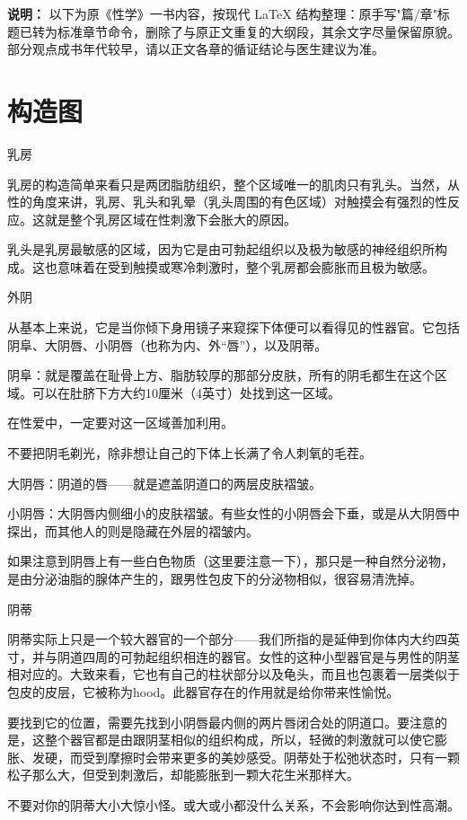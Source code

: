 \documentclass[12pt,UTF8,openany]{ctexbook}
\begin{document}
\noindent\textbf{说明：} 以下为原《性学》一书内容，按现代 LaTeX 结构整理：原手写"篇/章"标题已转为标准章节命令，删除了与原正文重复的大纲段，其余文字尽量保留原貌。部分观点成书年代较早，请以正文各章的循证结论与医生建议为准。

\chapter{构造图}

乳房

乳房的构造简单来看只是两团脂肪组织，整个区域唯一的肌肉只有乳头。当然，从性的角度来讲，乳房、乳头和乳晕（乳头周围的有色区域）对触摸会有强烈的性反应。这就是整个乳房区域在性刺激下会胀大的原因。

乳头是乳房最敏感的区域，因为它是由可勃起组织以及极为敏感的神经组织所构成。这也意味着在受到触摸或寒冷刺激时，整个乳房都会膨胀而且极为敏感。

外阴

从基本上来说，它是当你倾下身用镜子来窥探下体便可以看得见的性器官。它包括阴阜、大阴唇、小阴唇（也称为内、外“唇”），以及阴蒂。

阴阜：就是覆盖在耻骨上方、脂肪较厚的那部分皮肤，所有的阴毛都生在这个区域。可以在肚脐下方大约10厘米（4英寸）处找到这一区域。

在性爱中，一定要对这一区域善加利用。

不要把阴毛剃光，除非想让自己的下体上长满了令人刺氧的毛茬。

大阴唇：阴道的唇——就是遮盖阴道口的两层皮肤褶皱。

小阴唇：大阴唇内侧细小的皮肤褶皱。有些女性的小阴唇会下垂，或是从大阴唇中探出，而其他人的则是隐藏在外层的褶皱内。

如果注意到阴唇上有一些白色物质（这里要注意一下），那只是一种自然分泌物，是由分泌油脂的腺体产生的，跟男性包皮下的分泌物相似，很容易清洗掉。

阴蒂

阴蒂实际上只是一个较大器官的一个部分——我们所指的是延伸到你体内大约四英寸，并与阴道四周的可勃起组织相连的器官。女性的这种小型器官是与男性的阴茎相对应的。大致来看，它也有自己的柱状部分以及龟头，而且也包裹着一层类似于包皮的皮层，它被称为hood。此器官存在的作用就是给你带来性愉悦。

要找到它的位置，需要先找到小阴唇最内侧的两片唇闭合处的阴道口。要注意的是，这整个器官都是由跟阴茎相似的组织构成，所以，轻微的刺激就可以使它膨胀、发硬，而受到摩擦时会带来更多的美妙感受。阴蒂处于松弛状态时，只有一颗松子那么大，但受到刺激后，却能膨胀到一颗大花生米那样大。

不要对你的阴蒂大小大惊小怪。或大或小都没什么关系，不会影响你达到性高潮。
\end{document}
